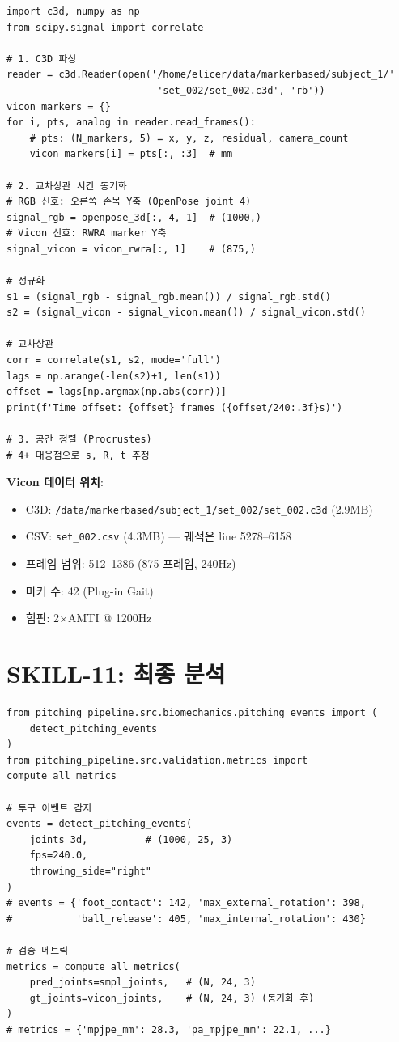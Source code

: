 \documentclass[11pt, a4paper]{report}
\begin{document}
\begin{codebox}[title={C3D 파싱 + 교차상관 동기화}]
\begin{verbatim}
import c3d, numpy as np
from scipy.signal import correlate

# 1. C3D 파싱
reader = c3d.Reader(open('/home/elicer/data/markerbased/subject_1/'
                          'set_002/set_002.c3d', 'rb'))
vicon_markers = {}
for i, pts, analog in reader.read_frames():
    # pts: (N_markers, 5) = x, y, z, residual, camera_count
    vicon_markers[i] = pts[:, :3]  # mm

# 2. 교차상관 시간 동기화
# RGB 신호: 오른쪽 손목 Y축 (OpenPose joint 4)
signal_rgb = openpose_3d[:, 4, 1]  # (1000,)
# Vicon 신호: RWRA marker Y축
signal_vicon = vicon_rwra[:, 1]    # (875,)

# 정규화
s1 = (signal_rgb - signal_rgb.mean()) / signal_rgb.std()
s2 = (signal_vicon - signal_vicon.mean()) / signal_vicon.std()

# 교차상관
corr = correlate(s1, s2, mode='full')
lags = np.arange(-len(s2)+1, len(s1))
offset = lags[np.argmax(np.abs(corr))]
print(f'Time offset: {offset} frames ({offset/240:.3f}s)')

# 3. 공간 정렬 (Procrustes)
# 4+ 대응점으로 s, R, t 추정
\end{verbatim}
\end{codebox}

\textbf{Vicon 데이터 위치}:
\begin{itemize}
\item C3D: \texttt{/data/markerbased/subject\_1/set\_002/set\_002.c3d} (2.9MB)
\item CSV: \texttt{set\_002.csv} (4.3MB) --- 궤적은 line 5278--6158
\item 프레임 범위: 512--1386 (875 프레임, 240Hz)
\item 마커 수: 42 (Plug-in Gait)
\item 힘판: 2$\times$AMTI @ 1200Hz
\end{itemize}


\section{SKILL-11: 최종 분석}

\begin{codebox}[title={투구 이벤트 감지 + 메트릭}]
\begin{verbatim}
from pitching_pipeline.src.biomechanics.pitching_events import (
    detect_pitching_events
)
from pitching_pipeline.src.validation.metrics import compute_all_metrics

# 투구 이벤트 감지
events = detect_pitching_events(
    joints_3d,          # (1000, 25, 3)
    fps=240.0,
    throwing_side="right"
)
# events = {'foot_contact': 142, 'max_external_rotation': 398,
#           'ball_release': 405, 'max_internal_rotation': 430}

# 검증 메트릭
metrics = compute_all_metrics(
    pred_joints=smpl_joints,   # (N, 24, 3)
    gt_joints=vicon_joints,    # (N, 24, 3) (동기화 후)
)
# metrics = {'mpjpe_mm': 28.3, 'pa_mpjpe_mm': 22.1, ...}
\end{verbatim}
\end{codebox}
\end{document}
